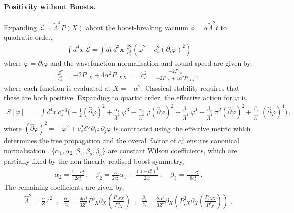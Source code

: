 \documentclass[11pt]{article}
\newcommand{\LambdaP}{\tilde{\Lambda}}
\begin{document}
\paragraph{Positivity without Boosts.}
Expanding $\mathcal{L} = \LambdaP^4 P(X)$ about the boost-breaking vacuum $\phi = \alpha \LambdaP^2 t$ to quadratic order,
\begin{align}
\int d^4 x \,  \mathcal{L} = \int dt \, d^3 \mathbf{x} \; \frac{Z^2}{c_s^3} \left(   \dot \varphi^2 - c_s^2 ( \partial_i \varphi )^2     \right)
\end{align}
where $\dot \varphi = \partial_t \varphi$ and the wavefunction normalisation and sound speed are given by,
\begin{align}
 \frac{Z^2}{c_s^3} = -2 P_{,X} + 4 \alpha^2 P_{,XX} \;\; , \quad c_s^2  = \frac{ -2 P_{,X} }{ -2 P_{,X} + 4 \alpha^2 P_{,XX} } \; ,
\end{align} 
where each function is evaluated at $X=-\alpha^2$. 
Classical stability requires that these are both positive. 
Expanding to quartic order, the effective action for $\varphi$ is,
\begin{align} 
 S[ \varphi ]&= \int d^4 x \, c_\pi^{-3} \Big(
-\tfrac{1}{2} ( \hat{\partial} \varphi)^2
+ \frac{ \alpha_1 }{ \hat{\Lambda}^2 }   \;  \dot \varphi^3 
- \frac{ \alpha_2 }{ \hat{\Lambda}^2 }  \; \dot \varphi ( \hat{\partial} \varphi)^2   
+ \frac{ \beta_1 }{ \hat{\Lambda}^4 }  \; \dot \varphi^4
- \frac{ \beta_2 }{  \hat{\Lambda}^4 }   \; \dot \pi^2  ( \hat{\partial} \varphi)^2  
+  \frac{ \beta_3 }{ \hat{\Lambda}^4 }   \; ( \hat{\partial} \varphi)^4  
\Big)\,,
\label{eqn:EFT_action}
\end{align}
where $( \hat{\partial} \varphi )^2 = -\dot \varphi^2 + c_s^2 \delta^{ij} \partial_i \varphi \partial_j \varphi$ is contracted using the effective metric which determines the free propagation and the overall factor of $c_\pi^3$ ensures canonical normalisation \cite{deRham:2017aoj, Grall:2020tqc}.
$\{ \alpha_1, \alpha_2 ,\beta_1, \beta_2, \beta_3 \}$ are constant Wilson coefficients, which are partially fixed by the non-linearly realised boost symmetry,
\begin{align}
	\alpha_2= \frac{1-c_s^2}{2c_s^2}\,,\quad \beta_2=\frac{3}{2c_s^2}\alpha_1+\frac{(1-c_s^2)^2}{2c_s^4}\,,\quad \beta_3=\frac{1-c_s^2}{8c_s^4}\, .
	\label{eqn:superfluid}
\end{align} 
The remaining coefficients are given by,
\begin{align}
 \hat{\Lambda}^2 = \frac{\alpha}{Z} \Lambda^2 \;\; , \;\; \frac{\alpha_1}{c_s^3} =  \frac{4 \alpha^4}{3 Z^2} P_{,X}^3 \partial_X \left( \frac{ P_{,XX} }{P_{,X}^3 }  \right)  \;\; ,  \;\; \frac{\beta_1}{c_s^3} =  \frac{2 \alpha^6}{3 Z^2} \partial_X \left( P_{,X}^3  \partial_X \left( \frac{ P_{,XX} }{P_{,X}^3 }  \right) \right) \; ,
\end{align}
\end{document}
